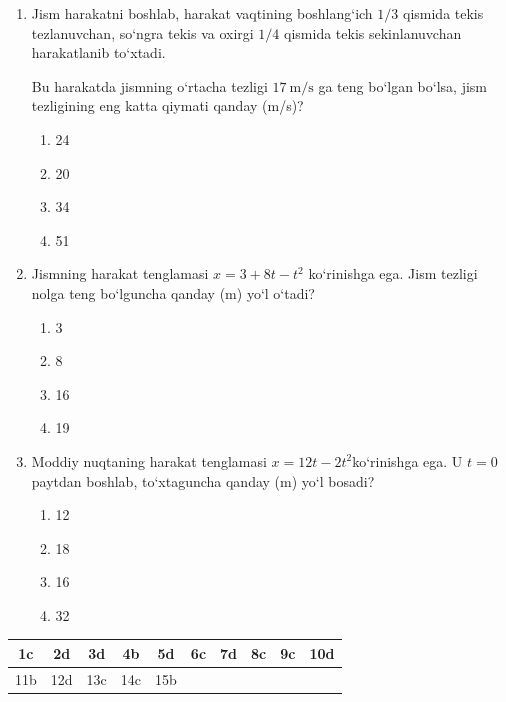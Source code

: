 \begin{enumerate}
\item Jism harakatni boshlab, harakat vaqtining boshlang‘ich 
$1/3$ qismida tekis tezlanuvchan, so‘ngra tekis va oxirgi 
$1/4$ qismida tekis sekinlanuvchan harakatlanib to‘xtadi. 

Bu harakatda jismning o‘rtacha tezligi $17\ \text{m/s}$ ga teng 
bo‘lgan bo‘lsa, jism tezligining eng katta qiymati qanday (m/s)?

\begin{enumerate}[label=\Alph*)]
\item 24
\item 20
\item 34
\item 51
\end{enumerate}


\item Jismning harakat tenglamasi $x = 3 + 8t - t^2$ ko‘rinishga ega. Jism tezligi nolga teng bo‘lguncha qanday (m) yo‘l o‘tadi?

\begin{enumerate}[label=\Alph*)]
\item 3
\item 8
\item 16
\item 19
\end{enumerate}


\item Moddiy nuqtaning harakat tenglamasi $x = 12t - 2t^2 $ko‘rinishga ega. U $t=0$ paytdan boshlab, to‘xtaguncha 
qanday (m) yo‘l bosadi?

\begin{enumerate}[label=\Alph*)]
\item 12
\item 18
\item 16
\item 32
\end{enumerate}

\end{enumerate}



\begin{table}[h!]
\centering
\begin{tabular}{|c|c|c|c|c|c|c|c|c|c|}
\hline
1c & 2d & 3d & 4b & 5d & 6c & 7d & 8c & 9c & 10d \\ \hline
11b & 12d & 13c & 14c & 15b &  &  &  &  &  \\ \hline
\end{tabular}
\end{table}










